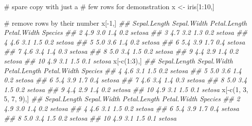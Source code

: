 \documentclass[
  13,
  letterpaper,
]{report}
\newenvironment{Shaded}{\begin{snugshade}}{\end{snugshade}}
\newcommand{\CommentTok}[1]{\textcolor[rgb]{0.37,0.37,0.37}{#1}}
\newcommand{\DecValTok}[1]{\textcolor[rgb]{0.68,0.00,0.00}{#1}}
\newcommand{\DocumentationTok}[1]{\textcolor[rgb]{0.37,0.37,0.37}{\textit{#1}}}
\newcommand{\FunctionTok}[1]{\textcolor[rgb]{0.28,0.35,0.67}{#1}}
\newcommand{\NormalTok}[1]{\textcolor[rgb]{0.00,0.23,0.31}{#1}}
\newcommand{\OtherTok}[1]{\textcolor[rgb]{0.00,0.23,0.31}{#1}}
\newcommand{\SpecialCharTok}[1]{\textcolor[rgb]{0.37,0.37,0.37}{#1}}
\begin{document}
\begin{Shaded}
\begin{Highlighting}[]
\CommentTok{\# spare copy with just a }
\CommentTok{\# few rows for demonstration}
\NormalTok{x }\OtherTok{\textless{}{-}}\NormalTok{ iris[}\DecValTok{1}\SpecialCharTok{:}\DecValTok{10}\NormalTok{,] }

\CommentTok{\# remove rows by their number}
\NormalTok{x[}\SpecialCharTok{{-}}\DecValTok{1}\NormalTok{,]}
\DocumentationTok{\#\#    Sepal.Length Sepal.Width Petal.Length Petal.Width Species}
\DocumentationTok{\#\# 2           4.9         3.0          1.4         0.2  setosa}
\DocumentationTok{\#\# 3           4.7         3.2          1.3         0.2  setosa}
\DocumentationTok{\#\# 4           4.6         3.1          1.5         0.2  setosa}
\DocumentationTok{\#\# 5           5.0         3.6          1.4         0.2  setosa}
\DocumentationTok{\#\# 6           5.4         3.9          1.7         0.4  setosa}
\DocumentationTok{\#\# 7           4.6         3.4          1.4         0.3  setosa}
\DocumentationTok{\#\# 8           5.0         3.4          1.5         0.2  setosa}
\DocumentationTok{\#\# 9           4.4         2.9          1.4         0.2  setosa}
\DocumentationTok{\#\# 10          4.9         3.1          1.5         0.1  setosa}
\NormalTok{x[}\SpecialCharTok{{-}}\FunctionTok{c}\NormalTok{(}\DecValTok{1}\SpecialCharTok{:}\DecValTok{3}\NormalTok{),]}
\DocumentationTok{\#\#    Sepal.Length Sepal.Width Petal.Length Petal.Width Species}
\DocumentationTok{\#\# 4           4.6         3.1          1.5         0.2  setosa}
\DocumentationTok{\#\# 5           5.0         3.6          1.4         0.2  setosa}
\DocumentationTok{\#\# 6           5.4         3.9          1.7         0.4  setosa}
\DocumentationTok{\#\# 7           4.6         3.4          1.4         0.3  setosa}
\DocumentationTok{\#\# 8           5.0         3.4          1.5         0.2  setosa}
\DocumentationTok{\#\# 9           4.4         2.9          1.4         0.2  setosa}
\DocumentationTok{\#\# 10          4.9         3.1          1.5         0.1  setosa}
\NormalTok{x[}\SpecialCharTok{{-}}\FunctionTok{c}\NormalTok{(}\DecValTok{1}\NormalTok{, }\DecValTok{3}\NormalTok{, }\DecValTok{5}\NormalTok{, }\DecValTok{7}\NormalTok{, }\DecValTok{9}\NormalTok{),]}
\DocumentationTok{\#\#    Sepal.Length Sepal.Width Petal.Length Petal.Width Species}
\DocumentationTok{\#\# 2           4.9         3.0          1.4         0.2  setosa}
\DocumentationTok{\#\# 4           4.6         3.1          1.5         0.2  setosa}
\DocumentationTok{\#\# 6           5.4         3.9          1.7         0.4  setosa}
\DocumentationTok{\#\# 8           5.0         3.4          1.5         0.2  setosa}
\DocumentationTok{\#\# 10          4.9         3.1          1.5         0.1  setosa}


\end{Highlighting}
\end{Shaded}
\end{document}
